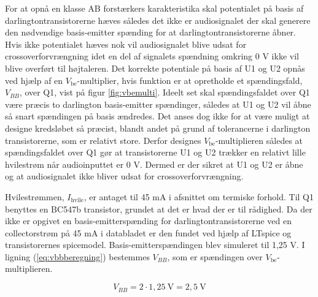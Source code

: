 For at opnå en klasse AB forstærkers karakteristika skal potentialet på basis af darlingtontransistorerne hæves således det ikke er audiosignalet der skal generere den nødvendige basis-emitter spænding for at darlingtontransistorerne åbner. Hvis ikke potentialet hæves nok vil audiosignalet blive udsat for crossoverforvrængning idet en del af signalets spændning omkring 0 V ikke vil blive overført til højtaleren. Det korrekte potentiale på basis af U1 og U2 opnås ved hjælp af en $V_\mathrm{be}$-multiplier, hvis funktion er at opretholde et spændingsfald, $V_{BB}$, over Q1, vist på figur \ref{fig:vbemulti}. Ideelt set skal spændingsfaldet over Q1 være præcis to darlington basis-emitter spændinger, således at U1 og U2 vil åbne så snart spændingen på basis ændredes. Det anses dog ikke for at være muligt at designe kredsløbet så præcist, blandt andet på grund af tolerancerne i darlington transistorerne, som er relativt store. Derfor designes $V_\mathrm{be}$-multiplieren således at spændingsfaldet over Q1 gør at transistorerne U1 og U2 trækker en relativt lille hvilestrøm når audioinputtet er 0 V. Dermed er der sikret at U1 og U2 er åbne og at audiosignalet ikke bliver udsat for crossoverforvrængning. 


Hvilestrømmen, $I_{\mathrm{hvile}}$, er antaget til 45 mA i afsnittet om termiske forhold. Til Q1 benyttes en BC547b transistor, grundet at det er hvad der er til rådighed. Da der ikke er opgivet en basis-emitterspænding for darlingtontransistorerne ved en collectorstrøm på 45 mA i databladet \cite{bdx33-34-datablad} er den fundet ved hjælp af LTspice og transistorernes spicemodel. Basis-emitterspændingen blev simuleret til 1,25 V. I ligning (\ref{eq:vbbberegning}) bestemmes $V_{BB}$, som er spændingen over $V_\mathrm{be}$-multiplieren.

\begin{equation}
V_{BB} =2 \cdot 1,25~\mathrm{V} = 2,5~\mathrm{V}
\label{eq:vbbberegning}
\end{equation}

